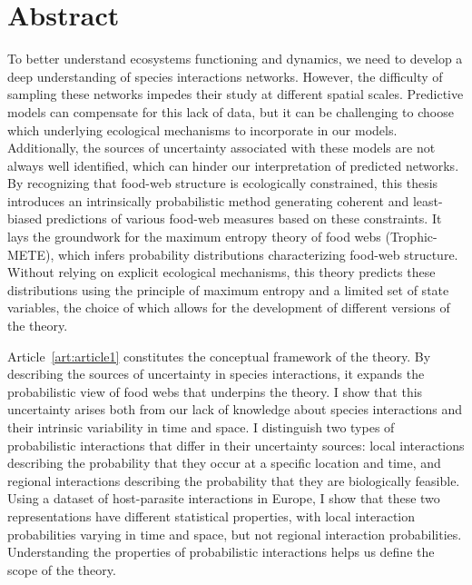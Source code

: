 \documentclass[12pt,twoside,phd]{dms}
\numberwithin{equation}{section}
\numberwithin{table}{chapter}
\numberwithin{figure}{chapter}
\begin{document}

\anglais
\chapter*{Abstract}

To better understand ecosystems functioning and dynamics, we need to develop a
deep understanding of species interactions networks. However, the difficulty of
sampling these networks impedes their study at different spatial scales.
Predictive models can compensate for this lack of data, but it can be
challenging to choose which underlying ecological mechanisms to incorporate in
our models. Additionally, the sources of uncertainty associated with these
models are not always well identified, which can hinder our interpretation of
predicted networks. By recognizing that food-web structure is ecologically
constrained, this thesis introduces an intrinsically probabilistic method
generating coherent and least-biased predictions of various food-web measures
based on these constraints. It lays the groundwork for the maximum entropy
theory of food webs (Trophic-METE), which infers probability distributions
characterizing food-web structure. Without relying on explicit ecological
mechanisms, this theory predicts these distributions using the principle of
maximum entropy and a limited set of state variables, the choice of which allows
for the development of different versions of the theory.

Article~\ref{art:article1} constitutes the conceptual framework of the theory.
By describing the sources of uncertainty in species interactions, it expands the
probabilistic view of food webs that underpins the theory. I show that this
uncertainty arises both from our lack of knowledge about species interactions
and their intrinsic variability in time and space. I distinguish two types of
probabilistic interactions that differ in their uncertainty sources: local
interactions describing the probability that they occur at a specific location
and time, and regional interactions describing the probability that they are
biologically feasible. Using a dataset of host-parasite interactions in Europe,
I show that these two representations have different statistical properties,
with local interaction probabilities varying in time and space, but not regional
interaction probabilities. Understanding the properties of probabilistic
interactions helps us define the scope of the theory.
\end{document}
